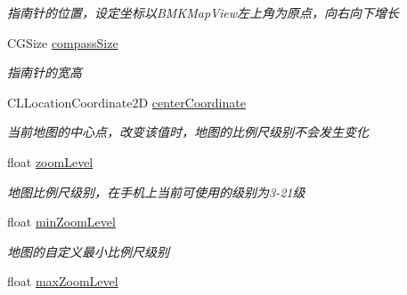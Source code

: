 \begin{DoxyCompactItemize}
\begin{DoxyCompactList}\small\item\em 指南针的位置，设定坐标以\+B\+M\+K\+Map\+View左上角为原点，向右向下增长 \end{DoxyCompactList}\item 
\hypertarget{interface_b_m_k_map_view_a7e8680b1e311b8130ffd4e8de1dfa857}{}C\+G\+Size \hyperlink{interface_b_m_k_map_view_a7e8680b1e311b8130ffd4e8de1dfa857}{compass\+Size}\label{interface_b_m_k_map_view_a7e8680b1e311b8130ffd4e8de1dfa857}

\begin{DoxyCompactList}\small\item\em 指南针的宽高 \end{DoxyCompactList}\item 
\hypertarget{interface_b_m_k_map_view_aa19c4d034a7861589044326107985632}{}C\+L\+Location\+Coordinate2\+D \hyperlink{interface_b_m_k_map_view_aa19c4d034a7861589044326107985632}{center\+Coordinate}\label{interface_b_m_k_map_view_aa19c4d034a7861589044326107985632}

\begin{DoxyCompactList}\small\item\em 当前地图的中心点，改变该值时，地图的比例尺级别不会发生变化 \end{DoxyCompactList}\item 
\hypertarget{interface_b_m_k_map_view_a5e6c1e21fddd4d6a24194be53f14c27e}{}float \hyperlink{interface_b_m_k_map_view_a5e6c1e21fddd4d6a24194be53f14c27e}{zoom\+Level}\label{interface_b_m_k_map_view_a5e6c1e21fddd4d6a24194be53f14c27e}

\begin{DoxyCompactList}\small\item\em 地图比例尺级别，在手机上当前可使用的级别为3-\/21级 \end{DoxyCompactList}\item 
\hypertarget{interface_b_m_k_map_view_ab504b39a0a908c811a258e058be7eeb9}{}float \hyperlink{interface_b_m_k_map_view_ab504b39a0a908c811a258e058be7eeb9}{min\+Zoom\+Level}\label{interface_b_m_k_map_view_ab504b39a0a908c811a258e058be7eeb9}

\begin{DoxyCompactList}\small\item\em 地图的自定义最小比例尺级别 \end{DoxyCompactList}\item 
\hypertarget{interface_b_m_k_map_view_ae9fce90bc3332cdf0dc477c3959e5e79}{}float \hyperlink{interface_b_m_k_map_view_ae9fce90bc3332cdf0dc477c3959e5e79}{max\+Zoom\+Level}\label{interface_b_m_k_map_view_ae9fce90bc3332cdf0dc477c3959e5e79}


\end{DoxyCompactItemize}
